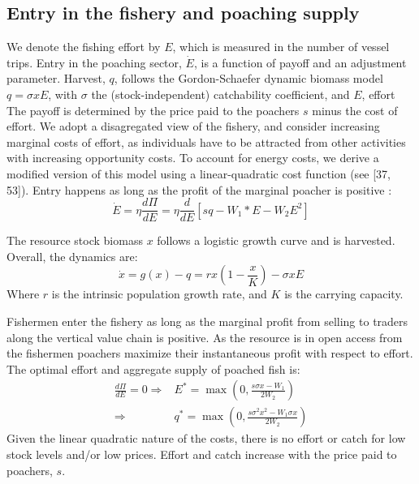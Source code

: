 


\subsection{Entry in the fishery and poaching supply}
We denote the fishing effort by $E$, which is measured in the number of vessel trips. Entry in the poaching sector, $\dot{E}$, is a function of payoff and an adjustment parameter.  Harvest, $q$, follows the Gordon-Schaefer  dynamic biomass model  $q = \sigma x E$, with $\sigma$ the (stock-independent) catchability coefficient, and $E$, effort
The payoff is determined by the price paid to the poachers $s$ minus the cost of effort. We adopt a disagregated view of the fishery, and consider increasing marginal costs of effort, as individuals have to be attracted from other activities with increasing opportunity costs. To account for energy costs, we derive a modified version of this model using a linear-quadratic cost function (see [37, 53]). Entry happens as long as the profit of the marginal poacher is positive : 
\begin{equation}
    \dot{E}= \eta \frac{d\Pi}{dE} = \eta \frac{d}{dE}\left[ sq-W_1 * E - W_2E^2\right]
\end{equation}

The resource stock biomass $x$ follows a logistic growth curve and is harvested. Overall, the dynamics are: 
\begin{equation}
    \dot{x} = g(x) - q = rx\left(1 - \frac{x}{K}\right) - \sigma x E
    \label{eq:growth}
\end{equation}
Where $r$ is the intrinsic population growth rate,  and $K$ is the carrying capacity. 

Fishermen enter the fishery as long as the marginal profit from selling to traders along the vertical value chain is positive. As the resource is in open access from the fishermen poachers maximize their instantaneous profit with respect to effort. The optimal effort and aggregate supply of poached fish is:
\begin{align}
    \frac{d \Pi}{d E} = 0
    \Rightarrow & E^* = \max\left( 0, \frac{s \sigma x  -W_1}{2W_2} \right)\\
    \Rightarrow & q^* = \max\left(0, \frac{s\sigma^2 x^2 - W_1\sigma x}{2 W_2}\right)
    \label{eq:poachers_supply}
\end{align}
Given the linear quadratic nature of the costs, there is no effort or catch for low stock levels and/or low prices. Effort and catch increase with the price paid to poachers, $s$.


